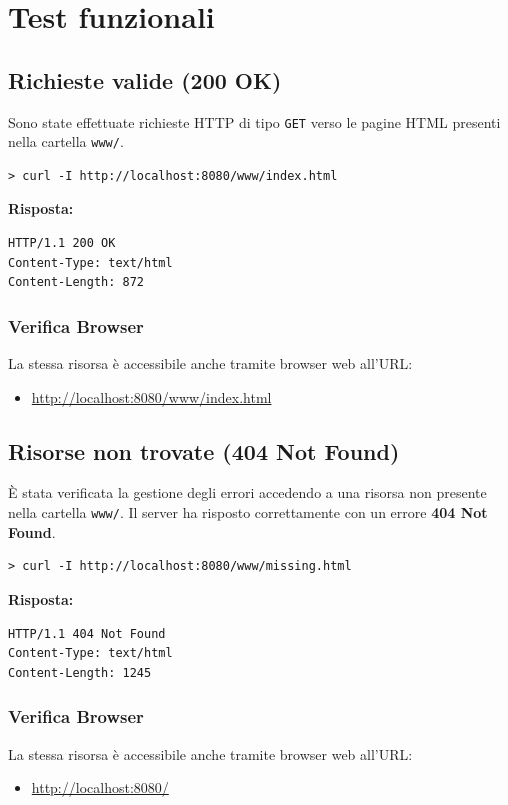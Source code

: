\documentclass[a4paper,12pt]{report}
\begin{document}
\section{Test funzionali}
\subsection{Richieste valide (200 OK)}
Sono state effettuate richieste HTTP di tipo \texttt{GET} verso le pagine HTML presenti nella cartella \texttt{www/}.

\begin{verbatim}
> curl -I http://localhost:8080/www/index.html
\end{verbatim}

\textbf{Risposta:}
\begin{verbatim}
HTTP/1.1 200 OK
Content-Type: text/html
Content-Length: 872
\end{verbatim}

\subsubsection{Verifica Browser}
La stessa risorsa è accessibile anche tramite browser web all'URL:
\begin{itemize}
    \item \url{http://localhost:8080/www/index.html}
\end{itemize}

\newpage
\subsection{Risorse non trovate (404 Not Found)}
È stata verificata la gestione degli errori accedendo a una risorsa non presente nella cartella \texttt{www/}. Il server ha risposto correttamente con un errore \textbf{404 Not Found}.
\begin{verbatim}
> curl -I http://localhost:8080/www/missing.html
\end{verbatim}

\textbf{Risposta:}
\begin{verbatim}
HTTP/1.1 404 Not Found
Content-Type: text/html
Content-Length: 1245
\end{verbatim}

\subsubsection{Verifica Browser}
La stessa risorsa è accessibile anche tramite browser web all'URL:
\begin{itemize}
    \item \url{http://localhost:8080/}
\end{itemize}
\end{document}
